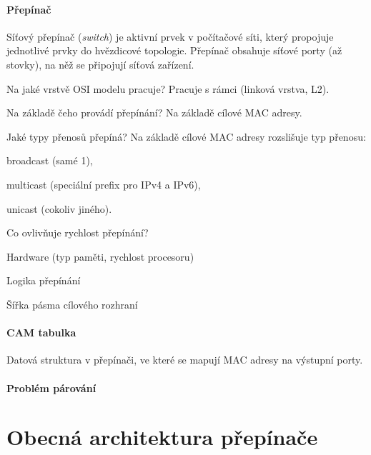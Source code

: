 \paragraph*{Přepínač} Síťový přepínač (\textit{switch}) je aktivní prvek v počítačové síti, který propojuje jednotlivé prvky do hvězdicové topologie. Přepínač obsahuje síťové porty (až stovky), na něž se připojují síťová zařízení. \begin{compactitem}
    \item Na jaké vrstvě OSI modelu pracuje? Pracuje s rámci (linková vrstva, L2).
    \item Na základě čeho provádí přepínání? Na základě cílové MAC adresy.
    \item Jaké typy přenosů přepíná? Na základě cílové MAC adresy rozslišuje typ přenosu: \begin{compactitem}
        \item broadcast (samé 1),
        \item multicast (speciální prefix pro IPv4 a IPv6),
        \item unicast (cokoliv jiného).
    \end{compactitem}
    \item Co ovlivňuje rychlost přepínání? \begin{compactitem}
        \item Hardware (typ paměti, rychlost procesoru)
        \item Logika přepínání
        \item Šířka pásma cílového rozhraní
    \end{compactitem}
\end{compactitem}

\paragraph*{CAM tabulka} Datová struktura v přepínači, ve které se mapují MAC adresy na výstupní porty.

\paragraph*{Problém párování} 


\section{Obecná architektura přepínače}

